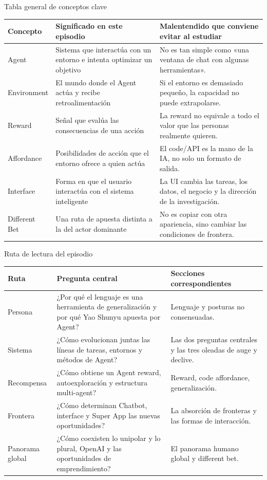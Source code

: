 \begin{knowledgebox}{Tabla general de conceptos clave}
\begin{tabularx}{\textwidth}{p{}p{}X}
\toprule
Concepto & Significado en este episodio & Malentendido que conviene evitar al estudiar \\
\midrule
Agent & Sistema que interactúa con un entorno e intenta optimizar un objetivo & No es tan simple como «una ventana de chat con algunas herramientas». \\
Environment & El mundo donde el Agent actúa y recibe retroalimentación & Si el entorno es demasiado pequeño, la capacidad no puede extrapolarse. \\
Reward & Señal que evalúa las consecuencias de una acción & La reward no equivale a todo el valor que las personas realmente quieren. \\
Affordance & Posibilidades de acción que el entorno ofrece a quien actúa & El code/API es la mano de la IA, no solo un formato de salida. \\
Interface & Forma en que el usuario interactúa con el sistema inteligente & La UI cambia las tareas, los datos, el negocio y la dirección de la investigación. \\
Different Bet & Una ruta de apuesta distinta a la del actor dominante & No es copiar con otra apariencia, sino cambiar las condiciones de frontera. \\
\bottomrule
\end{tabularx}
\end{knowledgebox}

\begin{knowledgebox}{Ruta de lectura del episodio}
\begin{tabularx}{\textwidth}{p{}p{}X}
\toprule
Ruta & Pregunta central & Secciones correspondientes \\
\midrule
Persona & ¿Por qué el lenguaje es una herramienta de generalización y por qué Yao Shunyu apuesta por Agent? & Lenguaje y posturas no consensuadas. \\
Sistema & ¿Cómo evolucionan juntas las líneas de tareas, entornos y métodos de Agent? & Las dos preguntas centrales y las tres oleadas de auge y declive. \\
Recompensa & ¿Cómo obtiene un Agent reward, autoexploración y estructura multi-agent? & Reward, code affordance, generalización. \\
Frontera & ¿Cómo determinan Chatbot, interface y Super App las nuevas oportunidades? & La absorción de fronteras y las formas de interacción. \\
Panorama global & ¿Cómo coexisten lo unipolar y lo plural, OpenAI y las oportunidades de emprendimiento? & El panorama humano global y different bet. \\
\bottomrule
\end{tabularx}
\end{knowledgebox}


